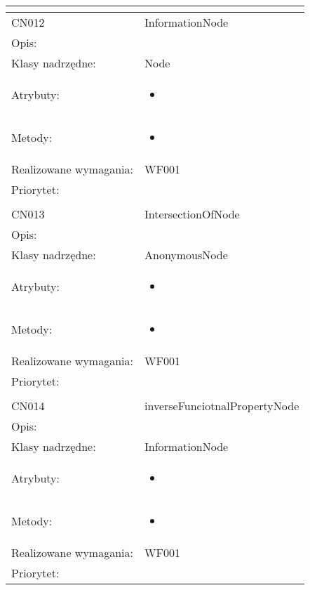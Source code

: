 \documentclass[a4paper,10pt]{article}
\begin{document}
\begin{center}
\begin{longtable}{|m{3cm}|m{9cm}|}
\multicolumn{2}{c}{} \\
 \hline

CN012 & InformationNode \\ \hline
Opis: &     \\ \hline
Klasy nadrzędne: & Node     \\ \hline
Atrybuty: & \begin{itemize}
 \item 
\end{itemize}
 \\ \hline
Metody: & \begin{itemize}
 \item 
\end{itemize}
  \\ \hline
Realizowane wymagania: & WF001 \\ \hline
Priorytet: &  \\ \hline

\multicolumn{2}{c}{} \\
 \hline

CN013 & IntersectionOfNode \\ \hline
Opis: &     \\ \hline
Klasy nadrzędne: & AnonymousNode     \\ \hline
Atrybuty: & \begin{itemize}
 \item 
\end{itemize}
 \\ \hline
Metody: & \begin{itemize}
 \item 
\end{itemize}
  \\ \hline
Realizowane wymagania: & WF001 \\ \hline
Priorytet: &  \\ \hline

\multicolumn{2}{c}{} \\
 \hline

CN014 & inverseFunciotnalPropertyNode \\ \hline
Opis: &     \\ \hline
Klasy nadrzędne: & InformationNode     \\ \hline
Atrybuty: & \begin{itemize}
 \item 
\end{itemize}
 \\ \hline
Metody: & \begin{itemize}
 \item 
\end{itemize}
  \\ \hline
Realizowane wymagania: & WF001 \\ \hline
Priorytet: &  \\ \hline


\end{longtable}
\end{center}
\end{document}
